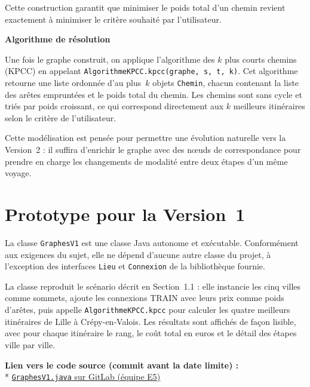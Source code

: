 \documentclass[fontsize=10pt,oneside,parskip=half]{scrreprt}
\newcommand{\ic}[1]{{\setlength{\fboxsep}{2pt}\colorbox{BeigeSerein}{\texttt{#1}}}}
\begin{document}
Cette construction garantit que minimiser le poids total d'un chemin revient
exactement à minimiser le critère souhaité par l'utilisateur.

\noindent\textbf{Algorithme de résolution}

Une fois le graphe construit, on applique l'algorithme des $k$ plus courts chemins
(KPCC) en appelant \ic{AlgorithmeKPCC.kpcc(graphe,\,s,\,t,\,k)}. Cet algorithme
retourne une liste ordonnée d'au plus~$k$ objets \ic{Chemin}, chacun contenant la
liste des arêtes empruntées et le poids total du chemin. Les chemins sont sans
cycle et triés par poids croissant, ce qui correspond directement aux $k$ meilleurs
itinéraires selon le critère de l'utilisateur.

Cette modélisation est pensée pour permettre une évolution naturelle vers la
Version~2 : il suffira d'enrichir le graphe avec des nœuds de correspondance pour
prendre en charge les changements de modalité entre deux étapes d'un même voyage.

\section{Prototype pour la Version~1}

La classe \ic{GraphesV1} est une classe Java autonome et exécutable. Conformément
aux exigences du sujet, elle ne dépend d'aucune autre classe du projet, à
l'exception des interfaces \ic{Lieu} et \ic{Connexion} de la bibliothèque fournie.

La classe reproduit le scénario décrit en Section~1.1 : elle instancie les cinq
villes comme sommets, ajoute les connexions TRAIN avec leurs prix comme poids
d'arêtes, puis appelle \ic{AlgorithmeKPCC.kpcc} pour calculer les quatre meilleurs
itinéraires de Lille à Crépy-en-Valois. Les résultats sont affichés de façon
lisible, avec pour chaque itinéraire le rang, le coût total en euros et le détail
des étapes ville par ville.

\noindent\textbf{Lien vers le code source (commit avant la date limite) :}\\*
\href{https://gitlab.univ-lille.fr/sae2.01-2.02/2026/E5/-/blob/main/src/main/java/sae/transport/comparison/graphs/GraphesV1.java?ref_type=heads}{\ic{GraphesV1.java} sur GitLab (équipe E5)}
\end{document}
